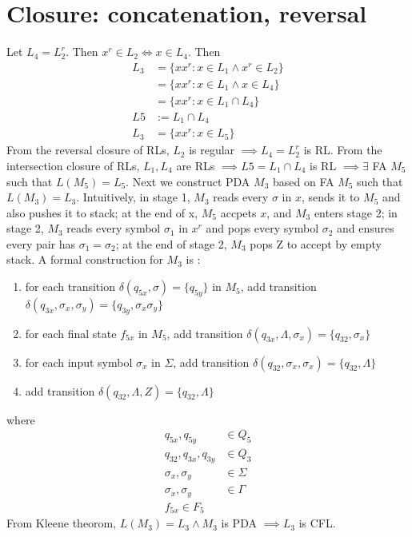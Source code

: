 \documentclass{article}
\begin{document}
\section{Closure: concatenation, reversal}
Let $L_4 = L_2^r$. Then $x^r \in L_2 \iff x \in L_4$. Then
\begin{align*}
L_3
&= \{xx^r : x \in L_1 \land x^r \in L_2\}\\
&= \{xx^r : x \in L_1 \land x \in L_4\}\\
&= \{xx^r : x \in L_1 \cap L_4\}\\
L5 &:= L_1 \cap L_4\\
L_3
&= \{xx^r : x \in L_5\}
\end{align*}
From the reversal closure of RLs, $L_2$ is regular $\implies L_4 =
L_2^r$ is RL. From the intersection closure of RLs, $L_1,
L_4$ are RLs $\implies L5 = L_1 \cap L_4$ is RL $\implies
\exists$ FA $M_5$ such that $ L(M_5) = L_5$. Next we construct PDA $M_3$ based
on FA $M_5$ such that $L(M_3) = L_3$. Intuitively, in stage 1, $M_3$ reads every
$\sigma$ in $x$, sends it to $M_5$ and also pushes it to stack; at the end of
x, $M_5$ accpets $x$, and $M_3$ enters stage 2; in stage 2, $M_3$ reads every
symbol $\sigma_1$ in $x^r$ and pops every symbol $\sigma_2$ and ensures every
pair has $\sigma_1 = \sigma_2$; at the end of stage 2, $M_3$ pops Z to accept by
empty stack. A formal construction for $M_3$ is :
\begin{enumerate}
  \item for each transition $\delta(q_{5x}, \sigma) = \{q_{5y}\}$ in $M_5$, add
  transition $\delta(q_{3x}, \sigma_x, \sigma_y) = \{q_{3y}, \sigma_x
  \sigma_y\}$
  \item for each final state $f_{5x}$ in $M_5$, add transition $\delta(q_{3x},
  \Lambda, \sigma_x) = \{q_{32}, \sigma_x\}$
  \item for each input symbol $\sigma_x$ in $\Sigma$, add transition
  $\delta(q_{32}, \sigma_x, \sigma_x) = \{q_{32}, \Lambda\}$
  \item add transition $\delta(q_{32}, \Lambda, Z) = \{q_{32}, \Lambda\}$
\end{enumerate}
where
\begin{align*}
q_{5x}, q_{5y} &\in Q_5\\
q_{32}, q_{3x}, q_{3y} &\in Q_3\\
\sigma_x, \sigma_y &\in \Sigma\\
\sigma_x, \sigma_y &\in \Gamma\\
f_{5x} \in F_5
\end{align*}
From Kleene theorom, $L(M_3) = L_3 \land M_3$ is PDA $\implies L_3$ is CFL.
\end{document}

